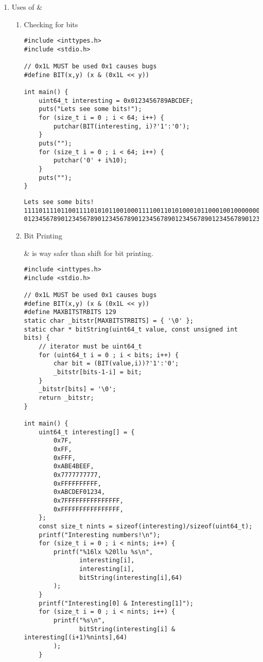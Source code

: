 \documentclass[11pt]{article}
\begin{document}
\begin{enumerate}
\item Uses of \&
\label{sec:org04c5eef}

\begin{enumerate}
\item Checking for bits
\label{sec:orgd7c0ba4}

\begin{verbatim}
#include <inttypes.h>
#include <stdio.h>

// 0x1L MUST be used 0x1 causes bugs
#define BIT(x,y) (x & (0x1L << y))

int main() {
    uint64_t interesting = 0x0123456789ABCDEF;
    puts("Lets see some bits!");
    for (size_t i = 0 ; i < 64; i++) {
        putchar(BIT(interesting, i)?'1':'0');
    }
    puts("");
    for (size_t i = 0 ; i < 64; i++) {
        putchar('0' + i%10);
    }
    puts("");
}
\end{verbatim}

\begin{verbatim}
Lets see some bits!
1111011110110011110101011001000111100110101000101100010010000000
0123456789012345678901234567890123456789012345678901234567890123
\end{verbatim}


\item Bit Printing
\label{sec:org5e495ae}

\& is way safer than shift for bit printing.

\begin{verbatim}
#include <inttypes.h>
#include <stdio.h>

// 0x1L MUST be used 0x1 causes bugs
#define BIT(x,y) (x & (0x1L << y))
#define MAXBITSTRBITS 129
static char _bitstr[MAXBITSTRBITS] = { '\0' };
static char * bitString(uint64_t value, const unsigned int bits) {
    // iterator must be uint64_t
    for (uint64_t i = 0 ; i < bits; i++) {
        char bit = (BIT(value,i))?'1':'0';
        _bitstr[bits-1-i] = bit;
    }
    _bitstr[bits] = '\0';
    return _bitstr;
}

int main() {
    uint64_t interesting[] = {
        0x7F,
        0xFF,
        0xFFF,
        0xABE4BEEF,
        0x7777777777,
        0xFFFFFFFFFF,
        0xABCDEF01234,
        0x7FFFFFFFFFFFFFFF,
        0xFFFFFFFFFFFFFFFF,
    };
    const size_t nints = sizeof(interesting)/sizeof(uint64_t);
    printf("Interesting numbers!\n");
    for (size_t i = 0 ; i < nints; i++) {
        printf("%16lx %20llu %s\n",
               interesting[i],
               interesting[i],
               bitString(interesting[i],64)
        );
    }
    printf("Interesting[0] & Interesting[1]");
    for (size_t i = 0 ; i < nints; i++) {
        printf("%s\n",
               bitString(interesting[i] & interesting[(i+1)%nints],64)
        );
    }


\end{verbatim}
\end{enumerate}
\end{enumerate}
\end{document}
